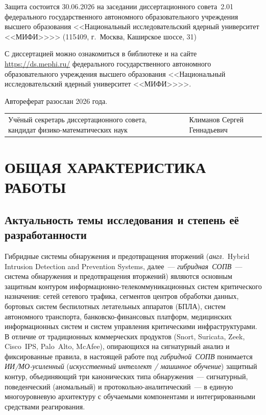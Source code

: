 \documentclass[12pt,a5paper]{article}
\begin{document}
{\noindent Защита состоится 30.06.2026 на заседании диссертационного совета~2.01 федерального государственного автономного образовательного учреждения высшего образования <<Национальный исследовательский ядерный университет <<МИФИ>>{}>> (115409, г.~Москва, Каширское шоссе, 31)

\vspace{0.1cm}

\noindent С диссертацией можно ознакомиться в библиотеке и на сайте \url{https://ds.mephi.ru/} федерального государственного автономного образовательного учреждения высшего образования <<Национальный исследовательский ядерный университет <<МИФИ>>{}>>.

\vspace{0.1cm}

\noindent Автореферат разослан \underline{\hspace{2.5cm}} 2026 года.

\vspace{0.2cm}

\noindent\begin{tabular}{@{}p{4.2cm}p{2cm}p{3.5cm}@{}}
Учёный секретарь диссертационного совета, кандидат физико-математических наук & & Климанов Сергей Геннадьевич \\
\end{tabular}
}

\newpage

\setcounter{page}{3}

\section*{ОБЩАЯ ХАРАКТЕРИСТИКА РАБОТЫ}

\subsection*{Актуальность темы исследования и степень её разработанности}

Гибридные системы обнаружения и предотвращения вторжений
(\emph{англ.}~Hybrid Intrusion Detection and Prevention Systems,
далее~--- \emph{гибридная~СОПВ}~--- система обнаружения и
предотвращения вторжений) являются основным защитным контуром
информационно-телекоммуникационных систем критического
назначения: сетей сетевого трафика, сегментов центров обработки
данных, бортовых систем беспилотных летательных аппаратов
(БПЛА), систем автономного транспорта, банковско-финансовых
платформ, медицинских информационных систем и систем
управления критическими инфраструктурами. В отличие от
традиционных коммерческих продуктов (Snort, Suricata, Zeek,
Cisco~IPS, Palo~Alto, McAfee), опирающихся на сигнатурный
анализ и фиксированные правила, в настоящей работе под
\emph{гибридной~СОПВ} понимается \emph{ИИ/МО-усиленный}
(\emph{искусственный интеллект / машинное обучение})
защитный контур, объединяющий три канонических типа
обнаружения~--- сигнатурный, поведенческий (аномальный) и
протокольно-аналитический~--- в единую многоуровневую
архитектуру с обучаемыми компонентами и интегрированными
средствами реагирования.
\end{document}
